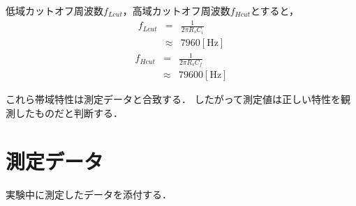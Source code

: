 \documentclass[dvipdfmx,titlepage,a4j]{jsarticle}  %
\begin{document}
低域カットオフ周波数$f_{Lcut}$，高域カットオフ周波数$f_{Hcut}$とすると，
\begin{eqnarray}
  f_{Lcut} &=& \frac{1}{2\pi R_s C_i}\\
  &\approx& 7960 \mathrm{[Hz]}
\end{eqnarray}
\begin{eqnarray}
  f_{Hcut} &=& \frac{1}{2\pi R_s C_f}\\
  &\approx& 79600 \mathrm{[Hz]}
\end{eqnarray}

これら帯域特性は測定データと合致する．
したがって測定値は正しい特性を観測したものだと判断する．

\section{測定データ}
実験中に測定したデータを添付する．
\end{document}
